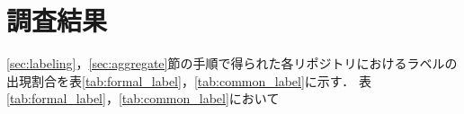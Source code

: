 \documentclass[main]{subfiles}
\begin{document}
\chapter{調査結果}

\ref{sec:labeling}，\ref{sec:aggregate}節の手順で得られた各リポジトリにおけるラベルの出現割合を表\ref{tab:formal_label}，\ref{tab:common_label}に示す．
表\ref{tab:formal_label}，\ref{tab:common_label}において


\end{document}
